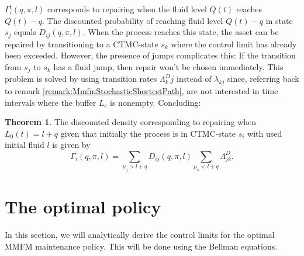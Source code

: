 \documentclass[a4paper]{thesis}
\theoremstyle{definition}
\newtheorem{theorem}{Theorem}[chapter]
\begin{document}
$\Gamma_i^t(q,\pi,l)$ corresponds to repairing when the fluid level $Q(t)$ reaches $Q(t)-q$.
The discounted probability of reaching fluid level $Q(t)-q$ in state $s_j$ equals $D_{ij}(q, \pi,l)$.
When the process reaches this state, the asset can be repaired by transitioning to a CTMC-state $s_k$ where the control limit has already been exceeded.
However, the presence of jumps complicates this:
If the transition from $s_j$ to $s_k$ has a fluid jump, then repair won't be chosen immediately.
This problem is solved by using transition rates $\Lambda^D_kj$ instead of $\lambda_{kj}$ since, referring back to remark \ref{remark:MmfmStochasticShortestPath}, are not interested in time intervals where the buffer $L_c$ is nonempty.
Concluding:

\begin{theorem}
	The discounted density corresponding to repairing when $L_0(t)=l+q$ given that initially the process is in CTMC-state $s_i$ with used initial fluid $l$ is given by
	\[
	\Gamma_i(q,\pi,l)=\sum\limits_{\mu_j>l+q}D_{ij}(q,\pi,l)\sum\limits_{\mu_k<l+q}\Lambda_{jk}^D.
	\]
\end{theorem}


%
 \section{The optimal policy}
In this section, we will analytically derive the control limits for the optimal MMFM maintenance policy.
This will be done using the Bellman equations.
\end{document}
